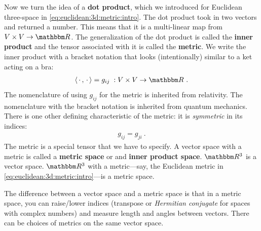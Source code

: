 \documentclass[12pt]{article}
\begin{document}
Now we turn the idea of a \textbf{dot product}, which we introduced for Euclidean three-space in \eqref{eq:euclidean:3d:metric:intro}.  The dot product took in two vectors and returned a number. This means that it is a multi-linear map from $V\times V \to \RR$. The generalization of the dot product is called the \textbf{inner product} and the tensor associated with it is called the \textbf{metric}. We write the inner product with a bracket notation that looks (intentionally) similar to a ket acting on a bra:
\begin{align}
    \langle \, \cdot \, , \, \cdot \, \rangle  = g_{ij} \; : V\times V \to \RR \ .
\end{align}
The nomenclature of using $g_{ij}$ for the metric is inherited from relativity. The nomenclature with the bracket notation is inherited from quantum mechanics. There is one other defining characteristic of the metric: it is \emph{symmetric} in its indices:
\begin{align}
    g_{ij} = g_{ji} \ .
\end{align}
The metric is a special tensor that we have to specify. A vector space with a metric is called a \textbf{metric space} or and \textbf{inner product space}. $\RR^3$ is a vector space. $\RR^3$ with a metric---say, the Euclidean metric in \eqref{eq:euclidean:3d:metric:intro}---is a metric space. 
\begin{bigidea}
The difference between a vector space and a metric space is that in a metric space, you can raise/lower indices (transpose or \emph{Hermitian conjugate} for spaces with complex numbers) and measure length and angles between vectors. There can be choices of metrics on the same vector space.
\end{bigidea}
\end{document}
